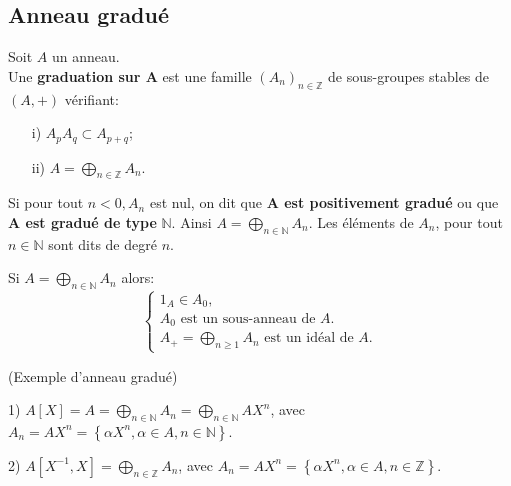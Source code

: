\subsection{Anneau gradué}
\begin{madefinition}
	Soit $A$ un anneau.\\
	Une \textbf{graduation sur A} est une famille $(A_n)_{n \in \mathbb{Z}}$ de  sous-groupes stables de $(A,+)$ vérifiant:
	\begin{enumerate}
		\item[i)] $ A_p A_q \subset A_{p+q} $;
		\item[ii)] $ A =\displaystyle \bigoplus_{n \in \mathbb{Z}}{A_n} $.
	\end{enumerate}
	Si pour tout $n < 0, A_n$ est nul, on dit que \textbf{A est positivement gradué} ou que \textbf{A est gradué de type} $\mathbb{N}$. Ainsi $ A =\displaystyle \bigoplus_{n \in \mathbb{N}}{A_n} $. Les éléments de $A_n$, pour tout $n \in \mathbb{N} $ sont dits de degré $n$.
\end{madefinition} 
\begin{maremarque}
	Si $ A =\displaystyle \bigoplus_{n \in \mathbb{N}}{A_n} $ alors:
	$$  
	\begin{cases}
		1_A \in A_0,\\
		A_0 \text{ est un sous-anneau de }A. \\
		 A_{+} =\displaystyle \bigoplus_{n \geqslant 1}{A_n} \text{ est un idéal de }A.
	\end{cases}
	$$
	\newline
	\begin{monexemple}
		(Exemple d'anneau gradué)\\
		\item[1)] $A[X] =  A =\displaystyle \bigoplus_{n \in \mathbb{N}}{A_n} =\displaystyle \bigoplus_{n \in \mathbb{N}}{A}X^n $, avec $A_n=AX^n = \left\{\alpha X^n, \alpha \in A, n \in \mathbb{N} \right\}$.
		\item[2)] $ A[X^{-1}, X] = \displaystyle \bigoplus_{n \in \mathbb{Z}}{A_n}$, avec $A_n=AX^n=\left\{\alpha X^n, \alpha \in A, n \in \mathbb{Z} \right\}$.
	\end{monexemple}
\end{maremarque}
